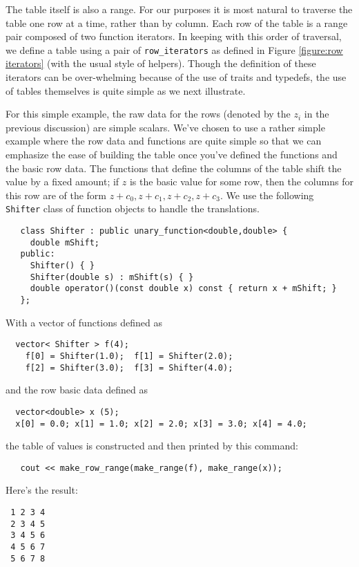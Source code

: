 \documentclass[12pt]{article}
\begin{document}
  The table itself is also a range.  For our purposes it is most
natural to traverse the table one row at a time, rather than by
column.  Each row of the table is a range pair composed of two
function iterators.  In keeping with this order of traversal, we
define a table using a pair of {\tt row\_iterators} as defined in
Figure \ref{figure:row iterators} (with the usual style of helpers).
Though the definition of these iterators can be over-whelming because
of the use of traits and typedefs, the use of tables themselves is
quite simple as we next illustrate.


  For this simple example, the raw data for the rows (denoted by the
$z_i$ in the previous discussion) are simple scalars.  We've chosen to
use a rather simple example where the row data and functions are quite
simple so that we can emphasize the ease of building the table once
you've defined the functions and the basic row data. The functions
that define the columns of the table shift the value by a fixed
amount; if $z$ is the basic value for some row, then the columns for this
row are of the form $z+c_0, z+c_1, z+c_2, z+c_3$.  We use the following {\tt
Shifter} class of function objects to handle the translations.
\begin{verbatim}
   class Shifter : public unary_function<double,double> {
     double mShift;
   public:
     Shifter() { }
     Shifter(double s) : mShift(s) { }
     double operator()(const double x) const { return x + mShift; }
   };
\end{verbatim}
With a vector of functions defined as
\begin{verbatim}
  vector< Shifter > f(4);
    f[0] = Shifter(1.0);  f[1] = Shifter(2.0);
    f[2] = Shifter(3.0);  f[3] = Shifter(4.0);
\end{verbatim}
and the row basic data defined as
\begin{verbatim}
  vector<double> x (5);
  x[0] = 0.0; x[1] = 1.0; x[2] = 2.0; x[3] = 3.0; x[4] = 4.0;
\end{verbatim}
the table of values is constructed and then printed by this command:
\begin{verbatim}
   cout << make_row_range(make_range(f), make_range(x));
\end{verbatim}
Here's the result:
\begin{verbatim}
 1 2 3 4 
 2 3 4 5 
 3 4 5 6 
 4 5 6 7 
 5 6 7 8 
\end{verbatim}
\end{document}
